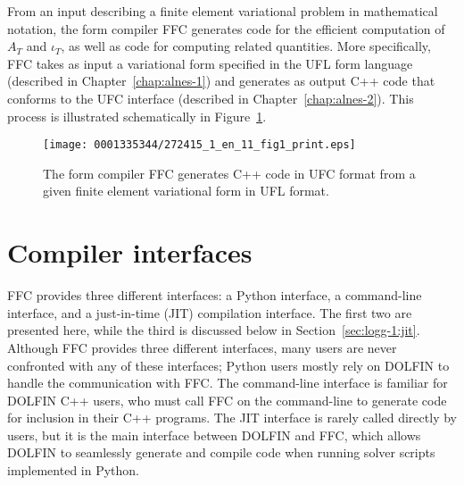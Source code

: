 From an input describing a finite element variational problem in
mathematical notation, the form compiler FFC generates code for the
efficient computation of $A_T$ and $\iota_T$, as well as code for
computing related quantities. More specifically, FFC takes as input a
variational form specified in the UFL form language (described in
Chapter~\ref{chap:alnes-1}) and generates as output C++ code that
conforms to the UFC interface (described in
Chapter~\ref{chap:alnes-2}). This process is illustrated schematically
in Figure~\ref{fig:logg-1:formcompiler}.

\makeatletter
\def\@img@cmode#1{\begingroup\color{graytwf}\mkrule{\ifnarrow 32mm\else\the\cmode@text@wd\fi}
{\ifnarrow 26pt\else\the\cmode@text@ht\fi}{\z@}\endgroup%
\llap{\vbox to\cmode@text@ht{\vss\hbox to\cmode@text@wd{\hss\ifnarrow\hspace*{65pt}\vbox to 31pt{\hsize7pc\raggedright#1}\else#1\fi\hss}\vss}}}
\makeatother

\begin{figure}
\bwfig
\narrowfigure
\centering
\texttt{[image: 0001335344/272415\_1\_en\_11\_fig1\_print.eps]}
  \caption{The form compiler FFC generates C++ code in UFC format
    from a given finite element variational form in UFL format.}
  \label{fig:logg-1:formcompiler}
\end{figure}

\section{Compiler interfaces}

FFC provides three different interfaces: a Python interface,
a command-line interface, and a just-in-time (JIT) compilation
interface. \pagebreak The first two are presented here, while the third is discussed below in Section~\ref{sec:logg-1:jit}. Although FFC provides three
different interfaces, many users are never confronted with any of these
interfaces; Python users mostly rely on DOLFIN to handle the communication
with FFC. The command-line interface is familiar for DOLFIN C++ users,
who must call FFC on the command-line to generate code for inclusion in
their C++ programs. The JIT interface is rarely called directly by users,
but it is the main interface between DOLFIN and FFC, which allows DOLFIN
to seamlessly generate and compile code when running solver scripts
implemented in Python.

